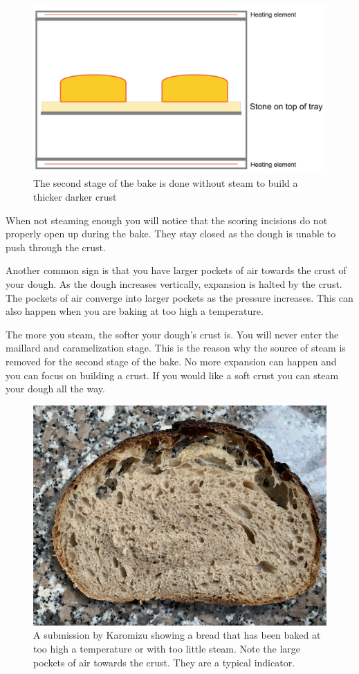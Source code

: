 \begin{figure}[!htb]
  \includegraphics[width=\textwidth]{baking-process-stage-2.jpg}
  \caption{The second stage of the bake is done without steam to build
  a thicker darker crust}
\end{figure}

When not steaming enough you will notice that the scoring
incisions do not properly open up during the bake. They stay
closed as the dough is unable to push through the crust.

Another common sign is that you have larger pockets
of air towards the crust of your dough. As the dough increases
vertically, expansion is halted by the crust. The pockets
of air converge into larger pockets as the pressure increases.
This can also happen when you are baking at too high a temperature.

The more you steam, the softer your dough's crust is. You will never
enter the maillard and caramelization stage. This
is the reason why the source of steam is removed
for the second stage of the bake. No more expansion can
happen and you can focus on building a crust. If you
would like a soft crust you can steam your dough all the
way.

\begin{figure}[!htb]
  \includegraphics[width=\textwidth]{baking-too-hot}
  \caption{A submission by Karomizu showing a bread that has been baked
  at too high a temperature or with too little steam. Note the large
  pockets of air towards the crust. They are a typical indicator.}
\end{figure}

